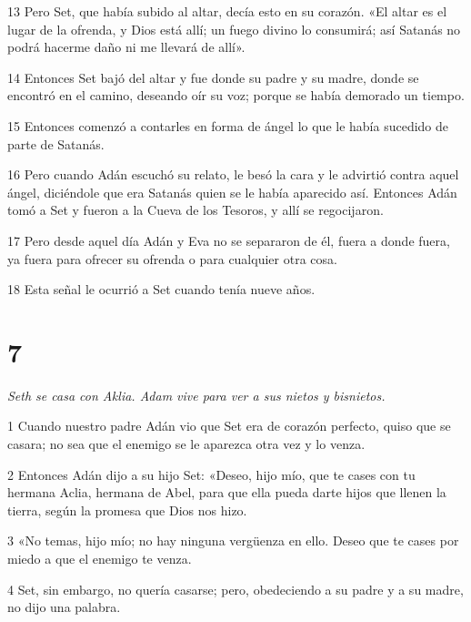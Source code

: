 \par 13 Pero Set, que había subido al altar, decía esto en su corazón. «El altar es el lugar de la ofrenda, y Dios está allí; un fuego divino lo consumirá; así Satanás no podrá hacerme daño ni me llevará de allí».

\par 14 Entonces Set bajó del altar y fue donde su padre y su madre, donde se encontró en el camino, deseando oír su voz; porque se había demorado un tiempo.

\par 15 Entonces comenzó a contarles en forma de ángel lo que le había sucedido de parte de Satanás.

\par 16 Pero cuando Adán escuchó su relato, le besó la cara y le advirtió contra aquel ángel, diciéndole que era Satanás quien se le había aparecido así. Entonces Adán tomó a Set y fueron a la Cueva de los Tesoros, y allí se regocijaron.

\par 17 Pero desde aquel día Adán y Eva no se separaron de él, fuera a donde fuera, ya fuera para ofrecer su ofrenda o para cualquier otra cosa.

\par 18 Esta señal le ocurrió a Set cuando tenía nueve años.

\chapter{7}

\par \textit{Seth se casa con Aklia. Adam vive para ver a sus nietos y bisnietos.}

\par 1 Cuando nuestro padre Adán vio que Set era de corazón perfecto, quiso que se casara; no sea que el enemigo se le aparezca otra vez y lo venza.

\par 2 Entonces Adán dijo a su hijo Set: «Deseo, hijo mío, que te cases con tu hermana Aclia, hermana de Abel, para que ella pueda darte hijos que llenen la tierra, según la promesa que Dios nos hizo.

\par 3 «No temas, hijo mío; no hay ninguna vergüenza en ello. Deseo que te cases por miedo a que el enemigo te venza.

\par 4 Set, sin embargo, no quería casarse; pero, obedeciendo a su padre y a su madre, no dijo una palabra.


